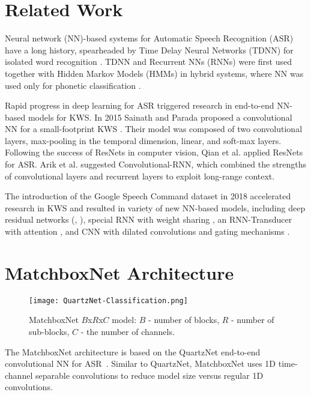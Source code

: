 \documentclass[a4paper]{article}
\begin{document}
\section{Related Work}
Neural network (NN)-based systems for Automatic Speech Recognition (ASR) have a long history, spearheaded by  Time Delay Neural Networks (TDNN) for isolated word recognition \cite{Waibel1989, lang1990}. TDNN and Recurrent NNs (RNNs) were first used together with Hidden Markov Models (HMMs) in hybrid systems, where NN was used only for phonetic classification \cite{Bengio1992, Robinson1994, Hermansky2000}. 

Rapid progress in deep learning for ASR \cite{Graves2004, Graves2005, Hinton2012} triggered research in end-to-end NN-based models for  KWS. In 2015 Sainath and Parada proposed a convolutional NN for a small-footprint KWS \cite{Sainath2015convolution}. Their model was composed of two convolutional layers, max-pooling in the temporal dimension, linear, and soft-max layers.
Following the success of ResNets \cite{he2015} in computer vision, Qian et al. \cite{qian2016very} applied ResNets for ASR. Arik et al. \cite{arik2017convolutional} suggested Convolutional-RNN, which combined the strengths of convolutional layers and recurrent layers to exploit long-range context.

The introduction of the Google Speech Command dataset \cite{warden2018speech} in 2018 accelerated research in KWS and resulted in variety of new NN-based models, including deep residual networks (\cite{Tang2018},  \cite{choi2019temporal}), special RNN with weight sharing \cite{kusupatiFastGRNN2018}, an RNN-Transducer with attention \cite{he2019streaming}, and CNN with dilated convolutions and gating mechanisms \cite{coucke2019dilatedgating}.

\section{MatchboxNet Architecture}

\begin{figure}[t]
  \centering
  \texttt{[image: QuartzNet-Classification.png]}
  \caption{MatchboxNet $B$x$R$x$C$ model: $B$ - number of blocks, \quad $R$ - number of sub-blocks, $C$ - the number of channels.}
  \label{fig:quartznet_arch}
\end{figure}

The MatchboxNet architecture is based on the QuartzNet end-to-end  convolutional NN for ASR~\cite{kriman2019quartznet}. Similar to QuartzNet, MatchboxNet uses 1D time-channel separable convolutions to reduce model size versus regular 1D convolutions. 
\end{document}
